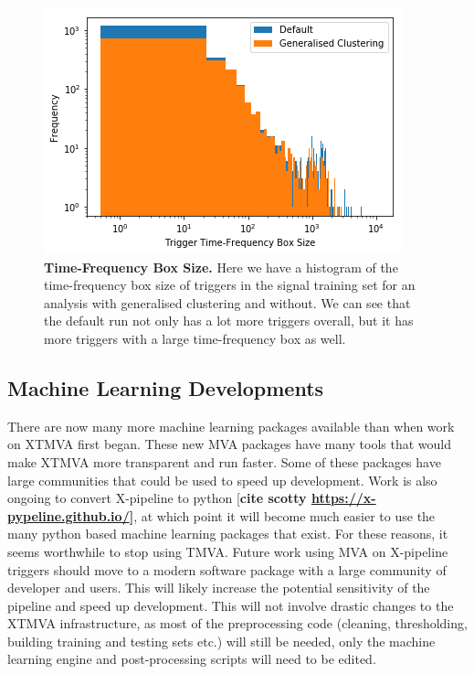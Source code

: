 \documentclass[11pt]{cuthesis}
\newcommand{\xp}{X-pipeline }
\begin{document}
\begin{figure} %
\begin{center}
\includegraphics[width=0.8\linewidth]{tf_box_histogram.png}
\end{center}
\caption{\textbf{Time-Frequency Box Size.} Here we have a histogram of the time-frequency box size of triggers in the signal training set for an analysis with generalised clustering and without. We can see that the default run not only has a lot more triggers overall, but it has more triggers with a large time-frequency box as well. }
\label{fig:tf box hist}
\end{figure}


\subsection{Machine Learning Developments}
There are now many more machine learning packages available than when work on XTMVA first began. These new MVA packages have many tools that would make XTMVA more transparent and run faster. Some of these packages have large communities that could be used to speed up development. Work is also ongoing to convert \xp to python [\textbf{cite scotty \url{https://x-pypeline.github.io/}]}, at which point it will become much easier to use the many python based machine learning packages that exist. For these reasons, it seems worthwhile to stop using TMVA. Future work using MVA on \xp triggers should move to a modern software package with a large community of developer and users. This will likely increase the potential sensitivity of the pipeline and speed up development. This will not involve drastic changes to the XTMVA infrastructure, as most of the preprocessing code (cleaning, thresholding, building training and testing sets etc.) will still be needed, only the machine learning engine and post-processing scripts will need to be edited.
\end{document}
